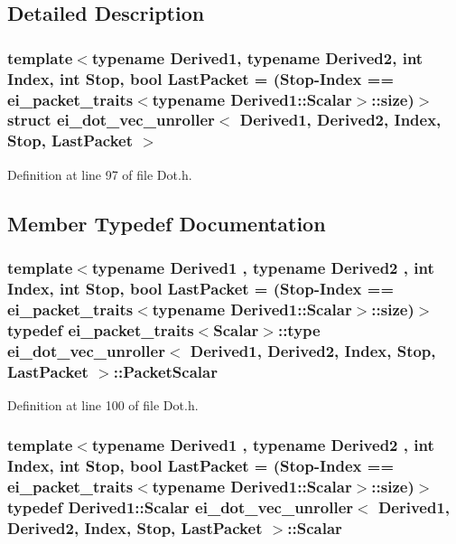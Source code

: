 \subsection{Detailed Description}
\subsubsection*{template$<$typename Derived1, typename Derived2, int Index, int Stop, bool Last\-Packet = (\-Stop-\/\-Index == ei\-\_\-packet\-\_\-traits$<$typename Derived1\-::\-Scalar$>$\-::size)$>$struct ei\-\_\-dot\-\_\-vec\-\_\-unroller$<$ Derived1, Derived2, Index, Stop, Last\-Packet $>$}



Definition at line 97 of file Dot.\-h.



\subsection{Member Typedef Documentation}
\hypertarget{structei__dot__vec__unroller_aedb0c88f724b3bb8dd27f66f649d29c8}{
\subsubsection[{Packet\-Scalar}]{\setlength{\rightskip}{0pt plus 5cm}template$<$typename Derived1 , typename Derived2 , int Index, int Stop, bool Last\-Packet = (\-Stop-\/\-Index == ei\-\_\-packet\-\_\-traits$<$typename Derived1\-::\-Scalar$>$\-::size)$>$ typedef {\bf ei\-\_\-packet\-\_\-traits}$<${\bf Scalar}$>$\-::{\bf type} {\bf ei\-\_\-dot\-\_\-vec\-\_\-unroller}$<$ Derived1, Derived2, Index, Stop, Last\-Packet $>$\-::{\bf Packet\-Scalar}}}\label{structei__dot__vec__unroller_aedb0c88f724b3bb8dd27f66f649d29c8}


Definition at line 100 of file Dot.\-h.

\hypertarget{structei__dot__vec__unroller_a8f9b3bdfd158f2fc14ce4e2bd08b0495}{
\subsubsection[{Scalar}]{\setlength{\rightskip}{0pt plus 5cm}template$<$typename Derived1 , typename Derived2 , int Index, int Stop, bool Last\-Packet = (\-Stop-\/\-Index == ei\-\_\-packet\-\_\-traits$<$typename Derived1\-::\-Scalar$>$\-::size)$>$ typedef Derived1\-::\-Scalar {\bf ei\-\_\-dot\-\_\-vec\-\_\-unroller}$<$ Derived1, Derived2, Index, Stop, Last\-Packet $>$\-::{\bf Scalar}}}\label{structei__dot__vec__unroller_a8f9b3bdfd158f2fc14ce4e2bd08b0495}



